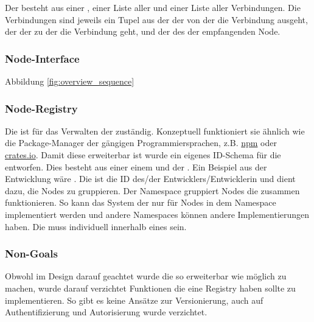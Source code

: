 \documentclass[ngerman]{article}
\begin{document}
Der  besteht aus einer , einer Liste aller  und einer Liste aller Verbindungen. 
Die Verbindungen sind jeweils ein Tupel aus der  der  von der die Verbindung ausgeht, der  der  zu der die Verbindung geht, und der  des  der empfangenden Node.

\pagebreak

\subsubsection{Node-Interface}
Abbildung \ref{fig:overview_sequence}
\label{sec:node_interface}

\subsubsection{Node-Registry}
\label{sec:node_registry}

Die  ist für das Verwalten der  zuständig. Konzeptuell funktioniert sie ähnlich wie die Package-Manager der gängigen Programmiersprachen, z.B. \href{https://www.npmjs.com/}{npm} oder \href{https://crates.io/}{crates.io}.
\br
Damit diese  erweiterbar ist wurde ein eigenes ID-Schema für die  entworfen. Dies besteht aus einer  einem  und der . 
Ein Beispiel aus der Entwicklung wäre .
\br
Die  ist die ID des/der Entwicklers/Entwicklerin und dient dazu, die Nodes zu gruppieren. Der Namespace gruppiert Nodes die zusammen funktionieren. So kann das System der  nur für Nodes in dem  Namespace implementiert werden und andere Namespaces können andere Implementierungen haben.
\br
Die  muss individuell innerhalb eines  sein. 
\subsubsection*{Non-Goals}
Obwohl im Design darauf geachtet wurde die  so erweiterbar wie möglich zu machen, wurde darauf verzichtet Funktionen die eine  Registry haben sollte zu implementieren. So gibt es keine Ansätze zur Versionierung, auch auf Authentifizierung und Autorisierung wurde verzichtet.
\end{document}
